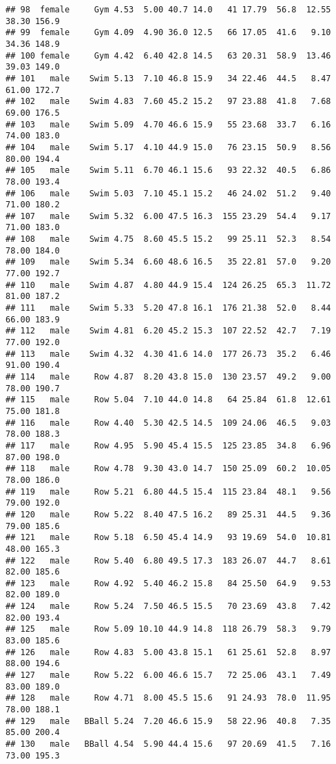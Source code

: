 \documentclass[
]{article}
\begin{document}
\begin{verbatim}
## 98  female     Gym 4.53  5.00 40.7 14.0   41 17.79  56.8  12.55  38.30 156.9
## 99  female     Gym 4.09  4.90 36.0 12.5   66 17.05  41.6   9.10  34.36 148.9
## 100 female     Gym 4.42  6.40 42.8 14.5   63 20.31  58.9  13.46  39.03 149.0
## 101   male    Swim 5.13  7.10 46.8 15.9   34 22.46  44.5   8.47  61.00 172.7
## 102   male    Swim 4.83  7.60 45.2 15.2   97 23.88  41.8   7.68  69.00 176.5
## 103   male    Swim 5.09  4.70 46.6 15.9   55 23.68  33.7   6.16  74.00 183.0
## 104   male    Swim 5.17  4.10 44.9 15.0   76 23.15  50.9   8.56  80.00 194.4
## 105   male    Swim 5.11  6.70 46.1 15.6   93 22.32  40.5   6.86  78.00 193.4
## 106   male    Swim 5.03  7.10 45.1 15.2   46 24.02  51.2   9.40  71.00 180.2
## 107   male    Swim 5.32  6.00 47.5 16.3  155 23.29  54.4   9.17  71.00 183.0
## 108   male    Swim 4.75  8.60 45.5 15.2   99 25.11  52.3   8.54  78.00 184.0
## 109   male    Swim 5.34  6.60 48.6 16.5   35 22.81  57.0   9.20  77.00 192.7
## 110   male    Swim 4.87  4.80 44.9 15.4  124 26.25  65.3  11.72  81.00 187.2
## 111   male    Swim 5.33  5.20 47.8 16.1  176 21.38  52.0   8.44  66.00 183.9
## 112   male    Swim 4.81  6.20 45.2 15.3  107 22.52  42.7   7.19  77.00 192.0
## 113   male    Swim 4.32  4.30 41.6 14.0  177 26.73  35.2   6.46  91.00 190.4
## 114   male     Row 4.87  8.20 43.8 15.0  130 23.57  49.2   9.00  78.00 190.7
## 115   male     Row 5.04  7.10 44.0 14.8   64 25.84  61.8  12.61  75.00 181.8
## 116   male     Row 4.40  5.30 42.5 14.5  109 24.06  46.5   9.03  78.00 188.3
## 117   male     Row 4.95  5.90 45.4 15.5  125 23.85  34.8   6.96  87.00 198.0
## 118   male     Row 4.78  9.30 43.0 14.7  150 25.09  60.2  10.05  78.00 186.0
## 119   male     Row 5.21  6.80 44.5 15.4  115 23.84  48.1   9.56  79.00 192.0
## 120   male     Row 5.22  8.40 47.5 16.2   89 25.31  44.5   9.36  79.00 185.6
## 121   male     Row 5.18  6.50 45.4 14.9   93 19.69  54.0  10.81  48.00 165.3
## 122   male     Row 5.40  6.80 49.5 17.3  183 26.07  44.7   8.61  82.00 185.6
## 123   male     Row 4.92  5.40 46.2 15.8   84 25.50  64.9   9.53  82.00 189.0
## 124   male     Row 5.24  7.50 46.5 15.5   70 23.69  43.8   7.42  82.00 193.4
## 125   male     Row 5.09 10.10 44.9 14.8  118 26.79  58.3   9.79  83.00 185.6
## 126   male     Row 4.83  5.00 43.8 15.1   61 25.61  52.8   8.97  88.00 194.6
## 127   male     Row 5.22  6.00 46.6 15.7   72 25.06  43.1   7.49  83.00 189.0
## 128   male     Row 4.71  8.00 45.5 15.6   91 24.93  78.0  11.95  78.00 188.1
## 129   male   BBall 5.24  7.20 46.6 15.9   58 22.96  40.8   7.35  85.00 200.4
## 130   male   BBall 4.54  5.90 44.4 15.6   97 20.69  41.5   7.16  73.00 195.3

\end{verbatim}
\end{document}

